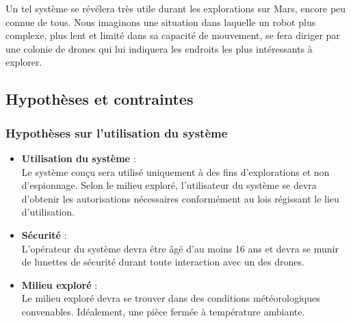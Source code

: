 \documentclass{mistcoursedoc}
\begin{document}
\par Un tel système se révélera très utile durant les explorations sur Mars, encore peu connue de tous.
Nous imaginons une situation dans laquelle un robot plus complexe,
plus lent et limité dans sa capacité de mouvement, se fera diriger par une colonie de drones qui
lui indiquera les endroits les plus intéressants à explorer.

\subsection{Hypothèses et contraintes}

\subsubsection{Hypothèses sur l'utilisation du système}

\begin{itemize}

  \item \textbf{Utilisation du système} :\\
        Le système conçu sera utilisé uniquement à des fins d'explorations et non d'espionnage.
        Selon le milieu exploré, l'utilisateur du système se devra d'obtenir les autorisations nécessaires conformément au lois régissant le lieu d’utilisation.
  \item \textbf{Sécurité} :\\
        L'opérateur du système devra être âgé d'au moins 16 ans et devra se munir de lunettes de sécurité durant toute interaction avec un des drones.
  \item \textbf{Milieu exploré} :\\
        Le milieu exploré devra se trouver dans des conditions météorologiques convenables.
        Idéalement, une pièce fermée à température ambiante.

\end{itemize}
\end{document}
